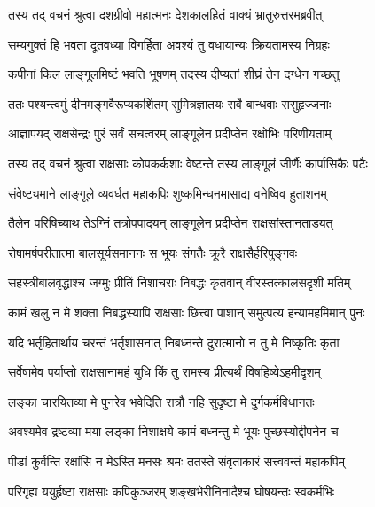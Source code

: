
\twolineshloka
{तस्य तद् वचनं श्रुत्वा दशग्रीवो महात्मनः}
{देशकालहितं वाक्यं भ्रातुरुत्तरमब्रवीत्} %

\twolineshloka
{सम्यगुक्तं हि भवता दूतवध्या विगर्हिता}
{अवश्यं तु वधायान्यः क्रियतामस्य निग्रहः} %

\twolineshloka
{कपीनां किल लाङ्गूलमिष्टं भवति भूषणम्}
{तदस्य दीप्यतां शीघ्रं तेन दग्धेन गच्छतु} %

\twolineshloka
{ततः पश्यन्त्वमुं दीनमङ्गवैरूप्यकर्शितम्}
{सुमित्रज्ञातयः सर्वे बान्धवाः ससुहृज्जनाः} %

\twolineshloka
{आज्ञापयद् राक्षसेन्द्रः पुरं सर्वं सचत्वरम्}
{लाङ्गूलेन प्रदीप्तेन रक्षोभिः परिणीयताम्} %

\twolineshloka
{तस्य तद् वचनं श्रुत्वा राक्षसाः कोपकर्कशाः}
{वेष्टन्ते तस्य लाङ्गूलं जीर्णैः कार्पासिकैः पटैः} %

\twolineshloka
{संवेष्ट्यमाने लाङ्गूले व्यवर्धत महाकपिः}
{शुष्कमिन्धनमासाद्य वनेष्विव हुताशनम्} %

\twolineshloka
{तैलेन परिषिच्याथ तेऽग्निं तत्रोपपादयन्}
{लाङ्गूलेन प्रदीप्तेन राक्षसांस्तानताडयत्} %

\twolineshloka
{रोषामर्षपरीतात्मा बालसूर्यसमाननः}
{स भूयः संगतैः क्रूरै राक्षसैर्हरिपुङ्गवः} %

\twolineshloka
{सहस्त्रीबालवृद्धाश्च जग्मुः प्रीतिं निशाचराः}
{निबद्धः कृतवान् वीरस्तत्कालसदृशीं मतिम्} %

\twolineshloka
{कामं खलु न मे शक्ता निबद्धस्यापि राक्षसाः}
{छित्त्वा पाशान् समुत्पत्य हन्यामहमिमान् पुनः} %

\twolineshloka
{यदि भर्तृहितार्थाय चरन्तं भर्तृशासनात्}
{निबध्नन्ते दुरात्मानो न तु मे निष्कृतिः कृता} %

\twolineshloka
{सर्वेषामेव पर्याप्तो राक्षसानामहं युधि}
{किं तु रामस्य प्रीत्यर्थं विषहिष्येऽहमीदृशम्} %

\twolineshloka
{लङ्का चारयितव्या मे पुनरेव भवेदिति}
{रात्रौ नहि सुदृष्टा मे दुर्गकर्मविधानतः} %

\twolineshloka
{अवश्यमेव द्रष्टव्या मया लङ्का निशाक्षये}
{कामं बध्नन्तु मे भूयः पुच्छस्योद्दीपनेन च} %

\twolineshloka
{पीडां कुर्वन्ति रक्षांसि न मेऽस्ति मनसः श्रमः}
{ततस्ते संवृताकारं सत्त्ववन्तं महाकपिम्} %

\twolineshloka
{परिगृह्य ययुर्हृष्टा राक्षसाः कपिकुञ्जरम्}
{शङ्खभेरीनिनादैश्च घोषयन्तः स्वकर्मभिः} %

